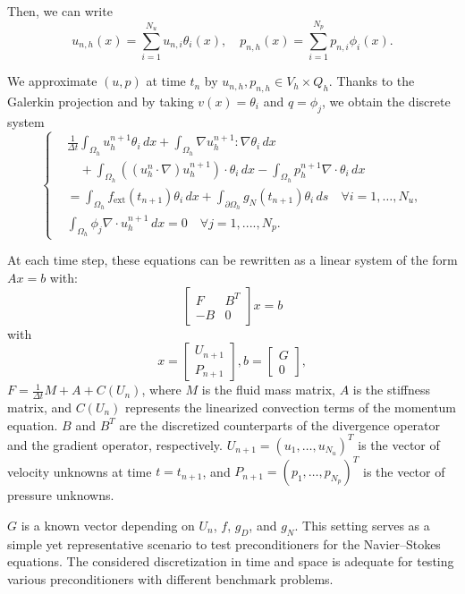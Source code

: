 \documentclass{article}
\begin{document}
Then, we can write
\[
u_{n,h}(x) = \sum_{i=1}^{N_u} u_{n,i} \theta_i(x), \quad p_{n,h}(x) = \sum_{i=1}^{N_p} p_{n,i} \phi_i(x).
\]

We approximate $(u, p)$ at time $t_n$ by $u_{n,h}, p_{n,h} \in V_h \times Q_h$. Thanks to the Galerkin projection and by taking \(v(x) = \theta_i \) and \(q = \phi_j \), we obtain the discrete system
\begin{equation}
\left\{
\begin{aligned}
    &\frac{1}{\Delta t} \int_{\Omega_h} u_h^{n+1} \theta_i \,dx + \int_{\Omega_h} \nabla u_h^{n+1} : \nabla \theta_i \,dx \\
    &\quad+ \int_{\Omega_h} \left((u_h^{n} \cdot \nabla)u_h^{n+1} \right) \cdot \theta_i \,dx - \int_{\Omega_h} p_h^{n+1} \nabla \cdot \theta_i \,dx \\
    &= \int_{\Omega_h} f_{\text{ext}}(t_{n+1}) \theta_i \,dx + \int_{\partial \Omega_h} g_N(t_{n+1}) \theta_i \,ds \quad \forall i = 1, \ldots, N_u, \\
    &\int_{\Omega_h} \phi_j \nabla \cdot u_h^{n+1} \,dx = 0 \quad \forall j = 1, .... , N_p.
\end{aligned}
\right.
\end{equation}

At each time step, these equations can be rewritten as a linear system of the form \(Ax = b\) with:
\[
\begin{bmatrix} F & B^T \\ -B & 0 \end{bmatrix} x =  b
\]
with \[x =\begin{bmatrix} U_{n+1} \\ P_{n+1} \end{bmatrix}, b=\begin{bmatrix} G \\ 0 \end{bmatrix},\]  \( F = \frac{1}{\Delta t} M + A + C(U_n) \), where \( M \) is the fluid mass matrix, \( A \) is the stiffness matrix, and \( C(U_n) \) represents the linearized convection terms of the momentum equation. \( B \) and \( B^T \) are the discretized counterparts of the divergence operator and the gradient operator, respectively. \( U_{n+1} = (u_1, \ldots, u_{N_u})^T \) is the vector of velocity unknowns at time \( t = t_{n+1} \), and \( P_{n+1} = (p_1, \ldots, p_{N_p})^T \) is the vector of pressure unknowns.

\( G \) is a known vector depending on \( U_n \), \( f \), \( g_D \), and \( g_N \). This setting serves as a simple yet representative scenario to test preconditioners for the Navier–Stokes equations. The considered discretization in time and space is adequate for testing various preconditioners with different benchmark problems.
\end{document}
